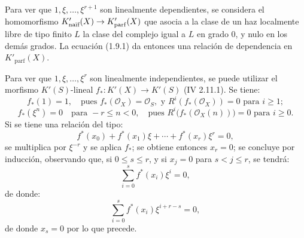 Para ver que $1,\xi,\ldots,\xi^{r+1}$ son linealmente dependientes, se considera el homomorfismo $K'_{\naif}(X)\to K'_{\mathrm{parf}}(X)$ que asocia a la clase de un haz localmente libre de tipo finito $L$ la clase del complejo igual a $L$ en grado $0$, y nulo en los demás grados. La ecuación (1.9.1) da entonces una relación de dependencia en $K'_{\mathrm{parf}}(X)$.

Para ver que $1,\xi,\ldots,\xi^r$ son linealmente independientes, se puede utilizar el morfismo $K'(S)$-lineal $f_*:K'(X)\to K'(S)$ (IV 2.11.1). Se tiene:
\[
  f_*(1)=1,
  \quad\text{pues } f_*(\mathcal O_X)=\mathcal O_S,\text{ y }R^i(f_*(\mathcal O_X))=0\text{ para }i\geq1;
\]
\[
  f_*(\xi^n)=0\quad\text{para }-r\leq n<0,
  \quad\text{pues }R^i\bigl(f_*(\mathcal O_X(n))\bigr)=0\text{ para }i\geq0.
\]
Si se tiene una relación del tipo:
\[
  f^*(x_0)+f^*(x_1)\xi+\cdots+f^*(x_r)\xi^r=0,
\]
se multiplica por $\xi^{-r}$ y se aplica $f_*$; se obtiene entonces $x_r=0$; se concluye por inducción, observando que, si $0\leq s\leq r$, y si $x_j=0$ para $s<j\leq r$, se tendrá:
\[
  \sum_{i=0}^{s}f^*(x_i)\xi^i=0,
\]
de donde:
\[
  \sum_{i=0}^{s}f^*(x_i)\xi^{i+r-s}=0,
\]
de donde $x_s=0$ por lo que precede.

